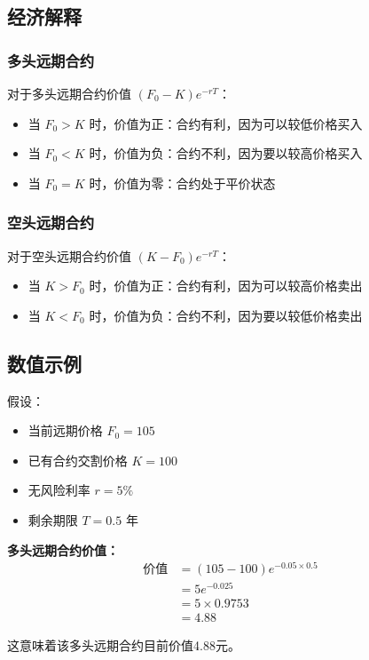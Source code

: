 \subsection{经济解释}

\subsubsection{多头远期合约}
对于多头远期合约价值 $(F_0 - K)e^{-rT}$：
\begin{itemize}
\item 当 $F_0 > K$ 时，价值为正：合约有利，因为可以较低价格买入
\item 当 $F_0 < K$ 时，价值为负：合约不利，因为要以较高价格买入  
\item 当 $F_0 = K$ 时，价值为零：合约处于平价状态
\end{itemize}

\subsubsection{空头远期合约}
对于空头远期合约价值 $(K - F_0)e^{-rT}$：
\begin{itemize}
\item 当 $K > F_0$ 时，价值为正：合约有利，因为可以较高价格卖出
\item 当 $K < F_0$ 时，价值为负：合约不利，因为要以较低价格卖出
\end{itemize}

\subsection{数值示例}

假设：
\begin{itemize}
\item 当前远期价格 $F_0 = 105$
\item 已有合约交割价格 $K = 100$
\item 无风险利率 $r = 5\%$
\item 剩余期限 $T = 0.5$ 年
\end{itemize}

\textbf{多头远期合约价值：}
\begin{align}
\text{价值} &= (105 - 100)e^{-0.05 \times 0.5} \\
&= 5e^{-0.025} \\
&= 5 \times 0.9753 \\
&= 4.88
\end{align}

这意味着该多头远期合约目前价值4.88元。

